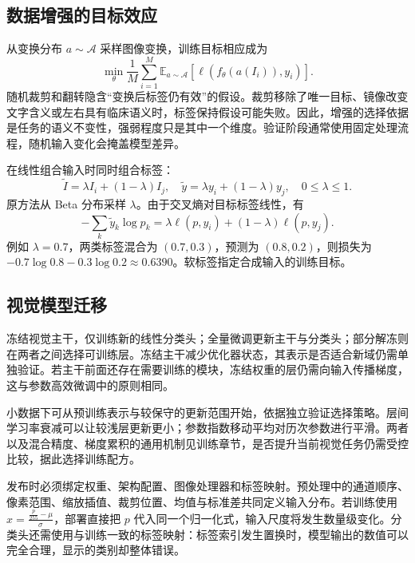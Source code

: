 \documentclass[../textbook.tex]{subfiles}
\begin{document}
\subsection{数据增强的目标效应}
从变换分布 $a\sim\mathcal A$ 采样图像变换，训练目标相应成为
\begin{equation}
 \min_\theta\frac1M\sum_{i=1}^{M}
 \mathbb E_{a\sim\mathcal A}\left[\ell(f_\theta(a(I_i)),y_i)\right].
 \label{eq:vit-augmentation}
\end{equation}
随机裁剪和翻转隐含“变换后标签仍有效”的假设。裁剪移除了唯一目标、镜像改变文字含义或左右具有临床语义时，标签保持假设可能失败。因此，增强的选择依据是任务的语义不变性，强弱程度只是其中一个维度。验证阶段通常使用固定处理流程，随机输入变化会掩盖模型差异。

在线性组合输入时同时组合标签\cite{zhang2018mixup}：
\begin{equation}
 \widetilde I=\lambda I_i+(1-\lambda)I_j,\quad
 \widetilde y=\lambda y_i+(1-\lambda)y_j,\quad 0\leq\lambda\leq1.
\end{equation}
原方法从 Beta 分布采样 $\lambda$。由于交叉熵对目标标签线性，有
\begin{equation}
 -\sum_k\widetilde y_k\log p_k
 =\lambda\ell(p,y_i)+(1-\lambda)\ell(p,y_j).
\end{equation}
例如 $\lambda=0.7$，两类标签混合为 $(0.7,0.3)$，预测为 $(0.8,0.2)$，则损失为 $-0.7\log0.8-0.3\log0.2\approx0.6390$。软标签指定合成输入的训练目标。

\subsection{视觉模型迁移}
冻结视觉主干，仅训练新的线性分类头；全量微调更新主干与分类头；部分解冻则在两者之间选择可训练层。冻结主干减少优化器状态，其表示是否适合新域仍需单独验证。若主干前面还存在需要训练的模块，冻结权重的层仍需向输入传播梯度，这与参数高效微调中的原则相同。

小数据下可从预训练表示与较保守的更新范围开始，依据独立验证选择策略。层间学习率衰减可以让较浅层更新更小；参数指数移动平均对历次参数进行平滑。两者以及混合精度、梯度累积的通用机制见训练章节，是否提升当前视觉任务仍需受控比较，据此选择训练配方。

发布时必须绑定权重、架构配置、图像处理器和标签映射。预处理中的通道顺序、像素范围、缩放插值、裁剪位置、均值与标准差共同定义输入分布。若训练使用 $x=\frac{\frac{p}{255}-\mu}{\sigma}$，部署直接把 $p$ 代入同一个归一化式，输入尺度将发生数量级变化。分类头还需使用与训练一致的标签映射：标签索引发生置换时，模型输出的数值可以完全合理，显示的类别却整体错误。
\end{document}

